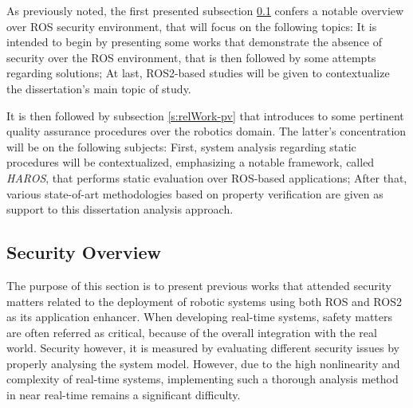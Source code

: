 As previously noted, the first presented subsection \ref{s:relWork-sec} confers a notable overview over ROS security environment, that will focus on the following topics: It is intended to begin by presenting some works that demonstrate the absence of security over the ROS environment, that is then followed by some attempts regarding solutions; At last, ROS2-based studies will be given to contextualize the dissertation's main topic of study. 

It is then followed by subsection \ref{s:relWork-pv} that introduces to some pertinent quality assurance procedures over the robotics domain. The latter's concentration will be on the following subjects: First, system analysis regarding static procedures will be contextualized, emphasizing a notable framework, called \textit{HAROS}, that performs static evaluation over ROS-based applications; After that, various state-of-art methodologies based on property verification are given as support to this dissertation analysis approach. 


\subsection{Security Overview}\label{s:relWork-sec}

The purpose of this section is to present previous works that attended security matters related to the deployment of robotic systems using both ROS and ROS2 as its application enhancer. When developing real-time systems, safety matters are often referred as critical, because of the overall integration with the real world. Security however, it is measured by evaluating different security issues by properly analysing the system model. However, due to the high nonlinearity and complexity of real-time systems, implementing such a thorough analysis method in near real-time remains a significant difficulty. \cite{diao2009design}


